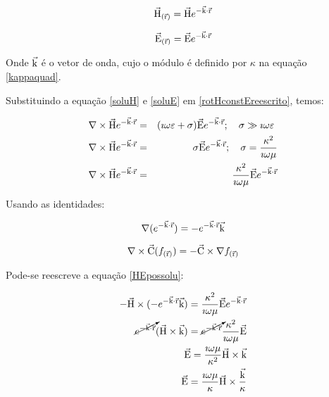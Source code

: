         \begin{equation}
            \label{soluH}
            \vec{\textrm{H}}_{(\vec{\textrm{r}})} = \vec{\textrm{H}} e^{-\vec{\textrm{k}} \cdot \vec{\textrm{r}}}
        \end{equation}

        \begin{equation}
            \label{soluE}
            \vec{\textrm{E}}_{(\vec{\textrm{r}})} = \vec{\textrm{E}} e^{-\vec{\textrm{k}} \cdot \vec{\textrm{r}}}
        \end{equation}

        \noindent Onde $\vec{\textrm{k}}$ é o vetor de onda, cujo o módulo é definido por $\kappa$ na equação \ref{kappaquad}.
        
        Substituindo a equação \ref{soluH} e \ref{soluE} em \ref{rotHconstEreescrito}, temos:
        
        {\setlength\arraycolsep{2pt}
        \begin{eqnarray}
            \label{HEpossolu}
            \nabla \times \vec{\textrm{H}}e^{-\vec{\textrm{k}} \cdot \vec{\textrm{r}}} & = & (\imath \omega \varepsilon + \sigma) \vec{\textrm{E}}e^{-\vec{\textrm{k}} \cdot \vec{\textrm{r}}}; \quad \sigma \gg \imath \omega \varepsilon \ \nonumber \\
            \nabla \times \vec{\textrm{H}}e^{-\vec{\textrm{k}} \cdot \vec{\textrm{r}}} & = & \sigma \vec{\textrm{E}}e^{-\vec{\textrm{k}} \cdot \vec{\textrm{r}}}; \quad \sigma = \dfrac{\kappa^2}{\imath \omega \mu} \nonumber \\
            \nabla \times \vec{\textrm{H}}e^{-\vec{\textrm{k}} \cdot \vec{\textrm{r}}} & = &\dfrac{\kappa^2}{\imath \omega \mu} \vec{\textrm{E}}e^{-\vec{\textrm{k}} \cdot \vec{\textrm{r}}}
        \end{eqnarray}} 
        
        \noindent Usando as identidades:
        
        \begin{equation}
            \nabla (e^{-\vec{\textrm{k}} \cdot \vec{\textrm{r}}}) = - e^{-\vec{\textrm{k}} \cdot \vec{\textrm{r}}} \vec{\textrm{k}}
        \end{equation}

        \begin{equation}
            \nabla \times \vec{\textrm{C}}(f_{(\vec{\textrm{r}})}) = - \vec{\textrm{C}} \times \nabla f_{(\vec{\textrm{r}})} 
        \end{equation}
        
        Pode-se reescreve a equação \ref{HEpossolu}:
        
        {\setlength\arraycolsep{2pt}
        \begin{eqnarray}
            - \vec{\textrm{H}} \times (- e^{-\vec{\textrm{k}} \cdot \vec{\textrm{r}}} \vec{\textrm{k}}) = \dfrac{\kappa^2}{\imath \omega \mu} \vec{\textrm{E}}e^{-\vec{\textrm{k}} \cdot \vec{\textrm{r}}} \nonumber \\
            \cancelto{}{e^{-\vec{\textrm{k}} \cdot \vec{\textrm{r}}}} (\vec{\textrm{H}} \times \vec{\textrm{k}}) = \cancelto{}{e^{-\vec{\textrm{k}} \cdot \vec{\textrm{r}}}} \dfrac{\kappa^2}{\imath \omega \mu} \vec{\textrm{E}}\nonumber \\
            \vec{\textrm{E}} = \dfrac{\imath \omega \mu}{\kappa^2} \vec{\textrm{H}} \times \vec{\textrm{k}} \nonumber \\
            \vec{\textrm{E}} = \dfrac{\imath \omega \mu}{\kappa} \vec{\textrm{H}} \times \dfrac{\vec{\textrm{k}}}{\kappa}
        \end{eqnarray}} 
        

